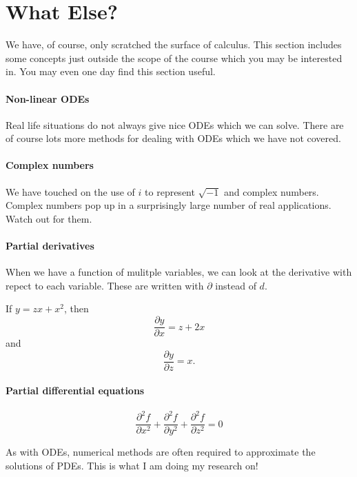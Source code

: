 \chapter{What Else?}

We have, of course, only scratched the surface of calculus.
This section includes some concepts just outside the scope of the course which you may be interested in.
You may even one day find this section useful.

\subsubsection{Non-linear ODEs}
Real life situations do not always give nice ODEs which we can solve. There are of course lots more methods for dealing with ODEs which we have not covered.

\subsubsection{Complex numbers}
We have touched on the use of $i$ to represent $\sqrt{-1}$ and complex numbers. Complex numbers pop up in a surprisingly large number of real applications. Watch out for them.

\subsubsection{Partial derivatives}
When we have a function of mulitple variables, we can look at the derivative with repect to each variable. These are written with $\partial$ instead of $d$.

\begin{example}
If $y = zx + x^2$, then \[\frac{\partial y}{\partial x}=z + 2x\] and \[\frac{\partial y}{\partial z}=x.\]
\end{example}

\subsubsection{Partial differential equations}
\begin{example}
\[\frac{\partial^2 f}{\partial x^2} + \frac{\partial^2 f}{\partial y^2} + \frac{\partial^2 f}{\partial z^2} = 0\]
\end{example}

As with ODEs, numerical methods are often required to approximate the solutions of PDEs. This is what I am doing my research on!

